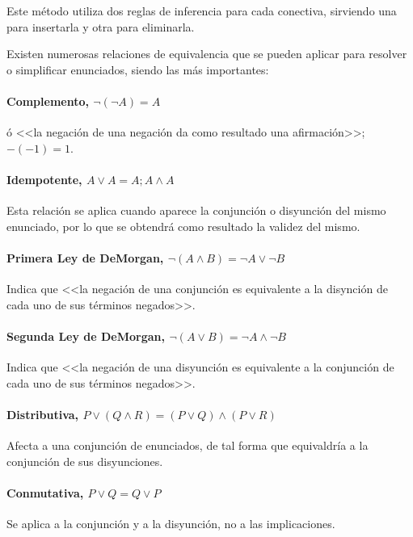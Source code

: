 \documentclass[a4paper, 11pt, titlepage]{article}
\begin{document}
            Este método utiliza dos reglas de inferencia para cada conectiva, sirviendo una para 
            insertarla y otra para eliminarla.

            Existen numerosas relaciones de equivalencia que se pueden aplicar para resolver 
            o simplificar enunciados, siendo las más importantes:

            \paragraph{Complemento, $\neg(\neg A) = A$} ó <<la negación de una negación da como 
            resultado una afirmación>>; $-(-1) = 1$.

            \paragraph{Idempotente, $A \lor A = A; A \land A$} Esta relación se aplica cuando 
            aparece la conjunción o disyunción del mismo enunciado, por lo que se obtendrá como 
            resultado la validez del mismo.


            \paragraph{Primera Ley de DeMorgan, $\neg (A \land B) = \neg A \lor \neg B$} Indica 
            que <<la negación de una conjunción es equivalente a la disynción de cada uno de sus 
            términos negados>>.             
            
            \paragraph{Segunda Ley de DeMorgan, $\neg (A \lor B) = \neg A \land \neg B$} Indica que 
            <<la negación de una disyunción es equivalente a la conjunción de cada uno de sus 
            términos negados>>.

            \paragraph{Distributiva, $P \lor (Q \land R) = (P \lor Q) \land (P \lor R)$} Afecta 
            a una conjunción de enunciados, de tal forma que equivaldría a la conjunción de sus 
            disyunciones.

            \paragraph{Conmutativa, $P \lor Q = Q \lor P$} Se aplica a la conjunción y a la 
            disyunción, no a las implicaciones.
\end{document}
